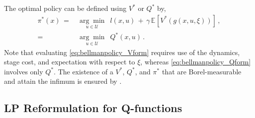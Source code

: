 \documentclass[journal]{IEEEtran}
\newcommand{\mcal}{\mathcal}
\newcommand{\textQ}{Q}
\newcommand{\expval}[2]{\mathbb{E}_{#1}\left[#2\right]}
\newcommand{\argmin}[1]{\underset{#1}{\arg\min}\,\,}
\begin{document}
The optimal policy can be defined using $V^\ast$ or $Q^\ast$ by,
\begin{subequations} \label{eq:bellmanpolicy}
	\begin{align}
		\pi^\ast(x)
			\,=&\, \argmin{u\in\mcal{U}} \, l\left( x , u \right) \, + \, \gamma \, \expval{}{V^{\ast}\left(g\left(x,u,\xi\right)\right)}
			\,,
			\label{eq:bellmanpolicy_Vform}
		\\
		=&\, \argmin{u\in\mcal{U}} \, Q^{\ast}(x,u)
			\,.
			\label{eq:bellmanpolicy_Qform}
	\end{align}
\end{subequations}
Note that evaluating \eqref{eq:bellmanpolicy_Vform} requires use of the dynamics, stage cost, and expectation with respect to $\xi$, whereas \eqref{eq:bellmanpolicy_Qform} involves only $Q^\ast$.
The existence of a $V^\ast$, $Q^\ast$, and $\pi^\ast$ that are Borel-measurable and attain the infimum is ensured by \cite[Assumptions 4.2.1(a), 4.2.1(b), 4.2.2]{hernandez_2012_discreteTimeMCP}.




\subsection{LP Reformulation for \textQ-functions} \label{sec:dp_lp}
\end{document}
